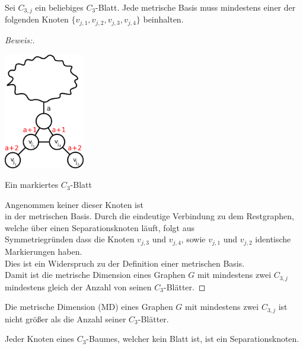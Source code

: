 \begin{lem}
Sei $C_{3,j}$ ein beliebiges $C_{3}$-Blatt. Jede metrische Basis muss mindestens einer der folgenden Knoten $\{v_{j,1},v_{j,2},v_{j,3},v_{j,4}\}$ beinhalten.
\end{lem}
\begin{proof}[Beweis:]~
\par
\vspace{-2mm}
\begin{floatingfigure}[l]{200pt}
{\flushleft
\hspace*{1.7cm}
\includegraphics[width=100pt]{bilder/beweis.pdf}}
\caption{Ein markiertes $C_{3}$-Blatt}
\end{floatingfigure}
Angenommen keiner dieser Knoten ist\\in der metrischen Basis. Durch die eindeutige Verbindung zu dem Restgraphen, welche über einen Separationsknoten läuft, folgt aus\\Symmetriegründen dass die Knoten $v_{j,3}$ und $v_{j,4}$, sowie $v_{j,1}$ und $v_{j,2}$ identische Markierungen haben.\\Dies ist ein Widerspruch zu der Definition einer metrischen Basis.\\
Damit ist die metrische Dimension eines Graphen $G$ mit mindestens zwei $C_{3,j}$\\mindestens gleich der Anzahl von seinen $C_{3}$-Blätter.
\end{proof}
\par
\vspace{+3mm}
\begin{lem}
Die metrische Dimension (MD) eines Graphen $G$ mit mindestens zwei $C_{3,j}$ ist nicht größer als die Anzahl seiner $C_{3}$-Blätter. 
\end{lem}
\begin{lem}
\label{bkb}
Jeder Knoten eines $C_{3}$-Baumes, welcher kein Blatt ist, ist ein Separationsknoten.
\end{lem}


